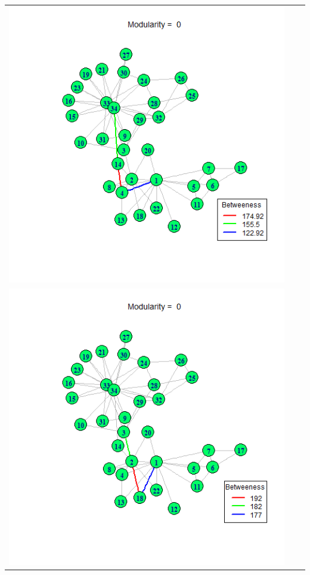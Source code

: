 \documentclass[letterpaper,11pt]{report}
\begin{document}
\begin{savenotes}
\begin{table}[htbp]
\begin{tabular}{ccc}
			\includegraphics[scale=0.28]{karateClub-community-0009.png} \\
			\includegraphics[scale=0.28]{karateClub-community-0010.png} &

\end{tabular}
\end{table}
\end{savenotes}
\end{document}

